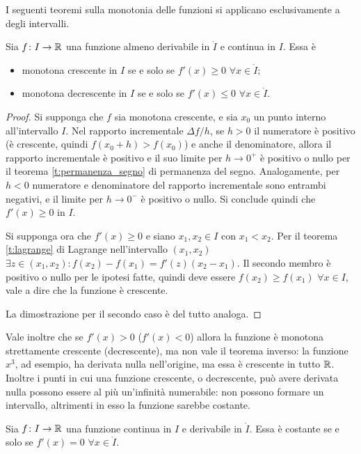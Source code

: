 I seguenti teoremi sulla monotonia delle funzioni si applicano esclusivamente a degli intervalli.
\begin{teorema}
\label{t:monotonia_lagrange}
Sia $f\colon I\to\mathbb{R}$ una funzione almeno derivabile in $\mathring{I}$ e continua in $I$. Essa è
\begin{itemize}
\item monotona crescente in $I$ se e solo se $f'(x)\geq 0$ $\forall x\in\mathring{I}$;
\item monotona decrescente in $I$ se e solo se $f'(x)\leq 0$ $\forall x\in\mathring{I}$.
\end{itemize}
\end{teorema}
\begin{proof}
Si supponga che $f$ sia monotona crescente, e sia $x_0$ un punto interno all'intervallo $I$. Nel rapporto incrementale $\Delta f/h$, se $h>0$ il numeratore è positivo (è crescente, quindi $f(x_0+h)>f(x_0)$) e anche il denominatore, allora il rapporto incrementale è positivo e il suo limite per $h\to 0^+$ è positivo o nullo per il teorema \ref{t:permanenza_segno} di permanenza del segno.
Analogamente, per $h<0$ numeratore e denominatore del rapporto incrementale sono entrambi negativi, e il limite per $h\to 0^-$ è positivo o nullo. Si conclude quindi che $f'(x)\geq 0$ in $I$.

Si supponga ora che $f'(x)\geq 0$ e siano $x_1,x_2\in I$ con $x_1<x_2$. Per il teorema \ref{t:lagrange} di Lagrange nell'intervallo $(x_1,x_2)$ $\exists z\in (x_1,x_2)\colon f(x_2)-f(x_1)=f'(z)(x_2-x_1)$. Il secondo membro è positivo o nullo per le ipotesi fatte, quindi deve essere $f(x_2)\geq f(x_1)$ $\forall x\in I$, vale a dire che la funzione è crescente.

La dimostrazione per il secondo caso è del tutto analoga.
\end{proof}
Vale inoltre che se $f'(x)>0$ ($f'(x)<0$) allora la funzione è monotona strettamente crescente (decrescente), ma non vale il teorema inverso: la funzione $x^3$, ad esempio, ha derivata nulla nell'origine, ma essa è crescente in tutto $\mathbb{R}$. Inoltre i punti in cui una funzione crescente, o decrescente, può avere derivata nulla possono essere al più un'infinità numerabile: non possono formare un intervallo, altrimenti in esso la funzione sarebbe costante.
\begin{teorema}
Sia $f\colon I\to\mathbb{R}$ una funzione continua in $I$ e derivabile in $\mathring{I}$. Essa è costante se e solo se $f'(x)=0$ $\forall x\in\mathring{I}$.
\end{teorema}
